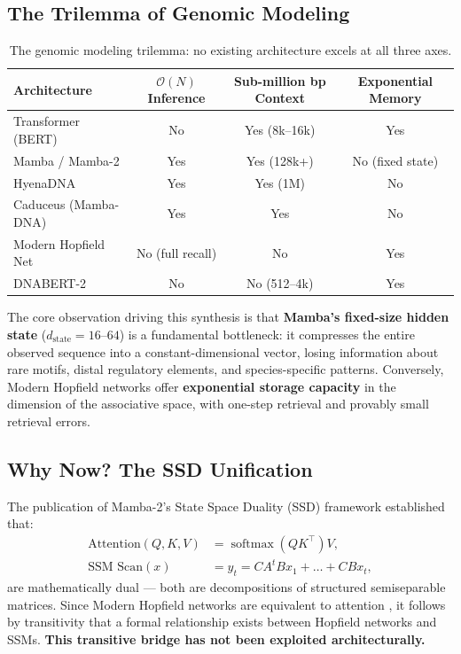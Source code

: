 \documentclass[11pt,a4paper]{article}
\numberwithin{equation}{section}
\newcommand{\softmax}{\operatorname{softmax}}
\begin{document}
\subsection{The Trilemma of Genomic Modeling}

\begin{table}[H]
\centering
\caption{The genomic modeling trilemma: no existing architecture excels at all three axes.}
\label{tab:trilemma}
\small
\begin{tabular}{lccc}
\toprule
\textbf{Architecture} & $\mathcal{O}(N)$ \newline Inference & Sub-million bp \newline Context & Exponential \newline Memory \\
\midrule
Transformer (BERT) & No & Yes (8k--16k) & Yes \\
Mamba / Mamba-2 & Yes & Yes (128k+) & No (fixed state) \\
HyenaDNA & Yes & Yes (1M) & No \\
Caduceus (Mamba-DNA) & Yes & Yes & No \\
Modern Hopfield Net & No (full recall) & No & Yes \\
DNABERT-2 & No & No (512--4k) & Yes \\
\bottomrule
\end{tabular}
\end{table}

The core observation driving this synthesis is that \textbf{Mamba's fixed-size hidden state}
($d_{\text{state}} = 16$--$64$) is a fundamental bottleneck: it compresses the entire
observed sequence into a constant-dimensional vector, losing information about rare motifs,
distal regulatory elements, and species-specific patterns. Conversely, Modern Hopfield
networks \cite{ramsauer2021hopfield} offer \textbf{exponential storage capacity} in the
dimension of the associative space, with one-step retrieval and provably small retrieval
errors.

\subsection{Why Now? The SSD Unification}

The publication of Mamba-2's State Space Duality (SSD) framework \cite{dao2024transformers}
established that:
\begin{align}
    \text{Attention}(Q,K,V) &= \softmax(QK^\top)V, \\
    \text{SSM Scan}(x)       &= y_t = C A^t B x_1 + \dots + C B x_t,
\end{align}
are mathematically dual --- both are decompositions of structured semiseparable matrices.
Since Modern Hopfield networks are equivalent to attention \cite{ramsauer2021hopfield}, it
follows by transitivity that a formal relationship exists between Hopfield networks and SSMs.
\textbf{This transitive bridge has not been exploited architecturally.}
\end{document}
